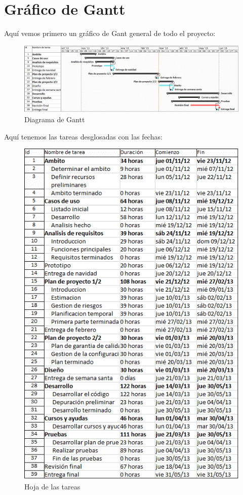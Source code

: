 \documentclass[spanish,a4paper,12pt]{report}	%
\begin{document}
	\section{Gráfico de  Gantt}

	Aquí vemos primero un gráfico de Gant general de todo el proyecto:

	\begin{figure}[!h]
	\centering
	\includegraphics[scale=0.57]{GraficoGantt.png}
	\caption{Diagrama de Gantt}
	\end{figure}

	\newpage

	Aquí tenemos las tareas desglosadas con las fechas:

	\begin{figure}[!h]
	\centering
	\includegraphics[scale=0.95]{HojaTareas.png}
	\caption{Hoja de las tareas}
	\end{figure}
\end{document}
